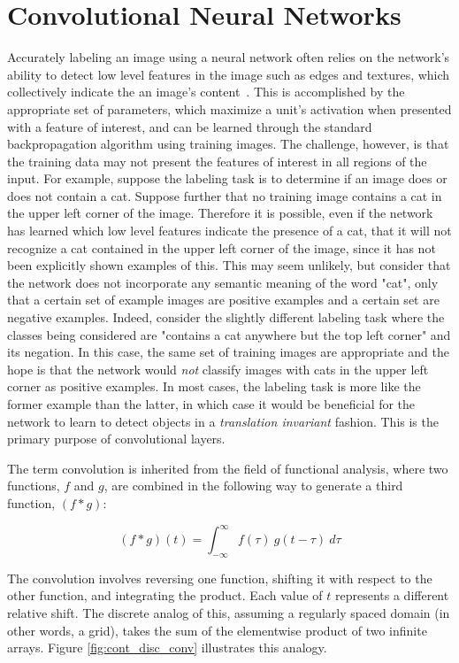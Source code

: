 \section{Convolutional Neural Networks}

Accurately labeling an image using a neural network often relies on the network's ability to detect low level features in the image such as edges and textures, which collectively indicate the an image's content~\cite{ng2011}.
This is accomplished by the appropriate set of parameters, which maximize a unit's activation when presented with a feature of interest, and can be learned through the standard backpropagation algorithm using training images. 
The challenge, however, is that the training data may not present the features of interest in all regions of the input. 
For example, suppose the labeling task is to determine if an image does or does not contain a cat.
Suppose further that no training image contains a cat in the upper left corner of the image.
Therefore it is possible, even if the network has learned which low level features indicate the presence of a cat, that it will not recognize a cat contained in the upper left corner of the image, since it has not been explicitly shown examples of this.
This may seem unlikely, but consider that the network does not incorporate any semantic meaning of the word "cat", only that a certain set of example images are positive examples and a certain set are negative examples.
Indeed, consider the slightly different labeling task where the classes being considered are "contains a cat anywhere but the top left corner" and its negation.
In this case, the same set of training images are appropriate and the hope is that the network would \textit{not} classify images with cats in the upper left corner as positive examples.
In most cases, the labeling task is more like the former example than the latter, in which case it would be beneficial for the network to learn to detect objects in a \textit{translation invariant} fashion. 
This is the primary purpose of convolutional layers.

The term convolution is inherited from the field of functional analysis, where two functions, $f$ and $g$, are combined in the following way to generate a third function, $(f*g)$:

\begin{equation}
(f*g)(t) = \int_{-\infty}^{\infty}f(\tau)~g(t-\tau)~d\tau
\label{eq:math_conv}
\end{equation}

\noindent
The convolution involves reversing one function, shifting it with respect to the other function, and integrating the product. 
Each value of $t$ represents a different relative shift.
The discrete analog of this, assuming a regularly spaced domain (in other words, a grid), takes the sum of the elementwise product of two infinite arrays.
Figure \ref{fig:cont_disc_conv} illustrates this analogy.

